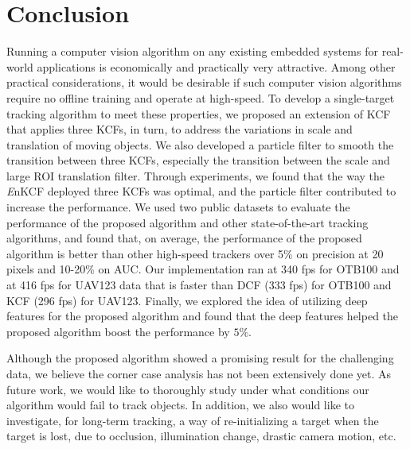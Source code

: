 \documentclass[10pt,twocolumn,letterpaper]{article}
\begin{document}
\section{Conclusion} \label{sc:Conclusion}
Running a computer vision algorithm on any existing embedded systems
for real-world applications is economically and practically very
attractive. Among other practical considerations, it would be
desirable if such computer vision algorithms require no offline
training and operate at high-speed. To develop a single-target
tracking algorithm to meet these properties, we proposed an extension
of KCF that applies three KCFs, in turn, to address the variations in
scale and translation of moving objects. We also developed a particle
filter to smooth the transition between three KCFs, especially the
transition between the scale and large ROI translation filter. Through
experiments, we found that the way the {\it E}nKCF deployed three KCFs
was optimal, and the particle filter contributed to increase the
performance.  We used two public datasets to evaluate the performance
of the proposed algorithm and other state-of-the-art tracking
algorithms, and found that, on average, the performance of the
proposed algorithm is better than other high-speed trackers over 5\%
on precision at 20 pixels and 10-20\% on AUC. Our implementation ran
at 340 fps for OTB100 and at 416 fps for UAV123 data that is faster
than DCF (333 fps) for OTB100 and KCF (296 fps) for UAV123. Finally,
we explored the idea of utilizing deep features for the proposed
algorithm and found that the deep features helped the proposed
algorithm boost the performance by $5\%$.

Although the proposed algorithm showed a promising result for the
challenging data, we believe the corner case analysis has not been
extensively done yet. As future work, we would like to thoroughly
study under what conditions our algorithm would fail to track
objects. In addition, we also would like to investigate, for long-term
tracking, a way of re-initializing a target when the target is lost,
due to occlusion, illumination change, drastic camera motion, etc.

{\small


}
\end{document}
